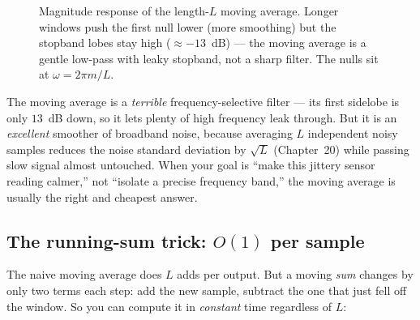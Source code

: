 \begin{figure}[H]
\centering
{}
\caption{Magnitude response of the length-$L$ moving average. Longer windows
push the first null lower (more smoothing) but the stopband lobes stay high
($\approx -13$~dB) --- the moving average is a gentle low-pass with leaky
stopband, not a sharp filter. The nulls sit at $\omega = 2\pi m/L$.}
\label{ch17:fig-ma}
\end{figure}

\begin{happeningbox}
The moving average is a \emph{terrible} frequency-selective filter --- its first
sidelobe is only $13$~dB down, so it lets plenty of high frequency leak through.
But it is an \emph{excellent} smoother of broadband noise, because averaging $L$
independent noisy samples reduces the noise standard deviation by $\sqrt{L}$
(Chapter~20) while passing slow signal almost untouched. When your goal is
``make this jittery sensor reading calmer,'' not ``isolate a precise frequency
band,'' the moving average is usually the right and cheapest answer.
\end{happeningbox}

\subsection{The running-sum trick: \texorpdfstring{$O(1)$}{O(1)} per sample}

The naive moving average does $L$ adds per output. But a moving \emph{sum}
changes by only two terms each step: add the new sample, subtract the one that
just fell off the window. So you can compute it in \emph{constant} time
regardless of $L$:

